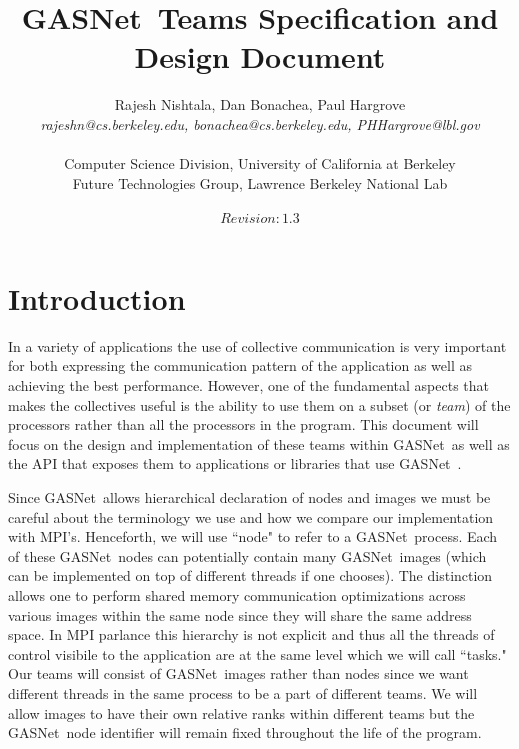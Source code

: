 \documentclass[times,10pt]{article}
\begin{document}
\newcommand{\gasnet}[0]{GASNet\ }





\title{\gasnet Teams Specification and Design Document}
\author{Rajesh Nishtala, Dan Bonachea, Paul Hargrove\\
    \emph{rajeshn@cs.berkeley.edu, bonachea@cs.berkeley.edu, PHHargrove@lbl.gov} \\\\
    Computer Science Division, University of California at Berkeley \\ 
    Future Technologies Group, Lawrence Berkeley National Lab\\ \\
    $Revision: 1.3 $ }
\maketitle


\section{Introduction}
In a variety of applications the use of collective communication is very
important for both expressing the communication pattern of the application as
well as achieving the best performance. However, one of the fundamental aspects
that makes the collectives useful is the ability to use them on a subset (or
\textit{team}) of the processors rather than all the processors in the program.
This document will focus on the design and implementation of these teams within
\gasnet as well as the API that exposes them to applications or libraries that
use \gasnet. 

Since \gasnet allows hierarchical declaration of nodes and images we must be
careful about the terminology we use and how we compare our implementation with
MPI's. Henceforth, we will use ``node" to refer to a \gasnet process. Each of
these \gasnet nodes can potentially contain many  \gasnet images (which can be
implemented on top of different threads if one chooses). The distinction allows
one to perform shared memory communication optimizations across various images
within the same node since they will share the same address space. In MPI
parlance this hierarchy is not explicit and thus all the threads of control
visibile to the application are at the same level which we will call ``tasks."
Our teams will consist of \gasnet images rather than nodes since we want
different threads in the same process to be a part of different teams. We will
allow images to have their own relative ranks within different teams but the
\gasnet node identifier will remain fixed throughout the life of the program. 
\end{document}

